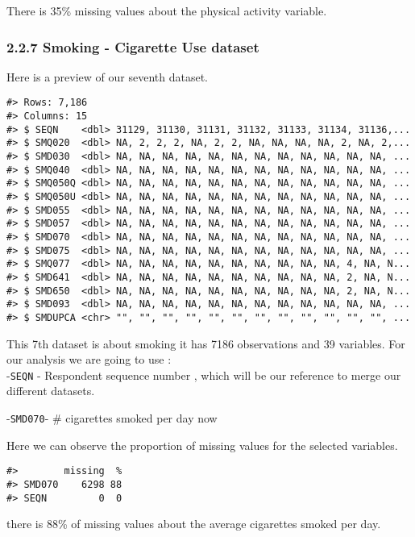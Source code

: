 \documentclass[
]{article}
\begin{document}
There is 35\% missing values about the physical activity variable.

\hypertarget{smoking---cigarette-use-dataset}{%
\subsubsection{2.2.7 Smoking - Cigarette Use
dataset}\label{smoking---cigarette-use-dataset}}

Here is a preview of our seventh dataset.

\begin{verbatim}
#> Rows: 7,186
#> Columns: 15
#> $ SEQN    <dbl> 31129, 31130, 31131, 31132, 31133, 31134, 31136,...
#> $ SMQ020  <dbl> NA, 2, 2, 2, NA, 2, 2, NA, NA, NA, NA, 2, NA, 2,...
#> $ SMD030  <dbl> NA, NA, NA, NA, NA, NA, NA, NA, NA, NA, NA, NA, ...
#> $ SMQ040  <dbl> NA, NA, NA, NA, NA, NA, NA, NA, NA, NA, NA, NA, ...
#> $ SMQ050Q <dbl> NA, NA, NA, NA, NA, NA, NA, NA, NA, NA, NA, NA, ...
#> $ SMQ050U <dbl> NA, NA, NA, NA, NA, NA, NA, NA, NA, NA, NA, NA, ...
#> $ SMD055  <dbl> NA, NA, NA, NA, NA, NA, NA, NA, NA, NA, NA, NA, ...
#> $ SMD057  <dbl> NA, NA, NA, NA, NA, NA, NA, NA, NA, NA, NA, NA, ...
#> $ SMD070  <dbl> NA, NA, NA, NA, NA, NA, NA, NA, NA, NA, NA, NA, ...
#> $ SMD075  <dbl> NA, NA, NA, NA, NA, NA, NA, NA, NA, NA, NA, NA, ...
#> $ SMQ077  <dbl> NA, NA, NA, NA, NA, NA, NA, NA, NA, NA, 4, NA, N...
#> $ SMD641  <dbl> NA, NA, NA, NA, NA, NA, NA, NA, NA, NA, 2, NA, N...
#> $ SMD650  <dbl> NA, NA, NA, NA, NA, NA, NA, NA, NA, NA, 2, NA, N...
#> $ SMD093  <dbl> NA, NA, NA, NA, NA, NA, NA, NA, NA, NA, NA, NA, ...
#> $ SMDUPCA <chr> "", "", "", "", "", "", "", "", "", "", "", "", ...
\end{verbatim}

This 7th dataset is about smoking it has 7186 observations and 39
variables. For our analysis we are going to use :\\
-\texttt{SEQN} - Respondent sequence number , which will be our
reference to merge our different datasets.

-\texttt{SMD070}- \# cigarettes smoked per day now

Here we can observe the proportion of missing values for the selected
variables.

\begin{verbatim}
#>        missing  %
#> SMD070    6298 88
#> SEQN         0  0
\end{verbatim}

there is 88\% of missing values about the average cigarettes smoked per
day.
\end{document}

